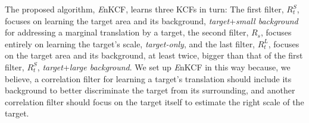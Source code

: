 \documentclass[10pt,twocolumn,letterpaper]{article}
\begin{document}
The proposed algorithm, {\it E}nKCF, learns three KCFs in turn: The
first filter, $R_{t}^{S}$, focuses on learning the target area and its
background, \textit{target}+\textit{small background} for addressing a
marginal translation by a target, the second filter, $R_{s}$, focuses
entirely on learning the target's scale, \textit{target-only}, and the
last filter, $R_{t}^{L}$, focuses on the target area and its
background, at least twice, bigger than that of the first filter,
$R_{t}^{S}$, \textit{target}+\textit{large background}. We set up {\it
  E}nKCF in this way because, we believe, a correlation filter for
learning a target's translation should include its background to
better discriminate the target from its surrounding, and another
correlation filter should focus on the target itself to estimate the
right scale of the target. 
\end{document}
